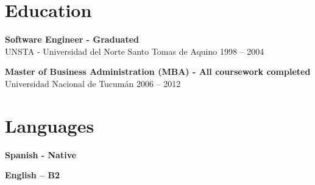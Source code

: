\documentclass[10pt,a4paper]{article}
\begin{document}
\vspace{3pt}

\section*{Education}

\textbf{Software Engineer - Graduated} \\
UNSTA - Universidad del Norte Santo Tomas de Aquino \hfill 1998 – 2004 \\

\vspace{1pt}

\textbf{Master of Business Administration (MBA) - All coursework completed} \\
Universidad Nacional de Tucumán \hfill 2006 – 2012

\vspace{3pt}

\section*{Languages}

\textbf{Spanish - Native} \\

\vspace{1pt}

\textbf{English – B2} \\
\end{document}
